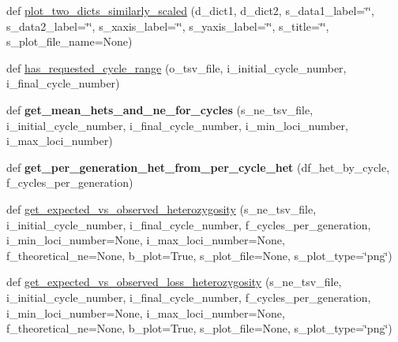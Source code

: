 \begin{DoxyCompactItemize}
\item 
def \hyperlink{namespacenegui_1_1pgvalidationtests_afbd41ca3bce1a778d97bd11efe270119}{plot\+\_\+two\+\_\+dicts\+\_\+similarly\+\_\+scaled} (d\+\_\+dict1, d\+\_\+dict2, s\+\_\+data1\+\_\+label=\char`\"{}\char`\"{}, s\+\_\+data2\+\_\+label=\char`\"{}\char`\"{}, s\+\_\+xaxis\+\_\+label=\char`\"{}\char`\"{}, s\+\_\+yaxis\+\_\+label=\char`\"{}\char`\"{}, s\+\_\+title=\char`\"{}\char`\"{}, s\+\_\+plot\+\_\+file\+\_\+name=None)
\item 
def \hyperlink{namespacenegui_1_1pgvalidationtests_acebbfd32727989f141b02f26e736b41c}{has\+\_\+requested\+\_\+cycle\+\_\+range} (o\+\_\+tsv\+\_\+file, i\+\_\+initial\+\_\+cycle\+\_\+number, i\+\_\+final\+\_\+cycle\+\_\+number)
\item 
def {\bfseries get\+\_\+mean\+\_\+hets\+\_\+and\+\_\+ne\+\_\+for\+\_\+cycles} (s\+\_\+ne\+\_\+tsv\+\_\+file, i\+\_\+initial\+\_\+cycle\+\_\+number, i\+\_\+final\+\_\+cycle\+\_\+number, i\+\_\+min\+\_\+loci\+\_\+number, i\+\_\+max\+\_\+loci\+\_\+number)\hypertarget{namespacenegui_1_1pgvalidationtests_a9d13db8def69ba2b1deeab9fd32eddf6}{}\label{namespacenegui_1_1pgvalidationtests_a9d13db8def69ba2b1deeab9fd32eddf6}

\item 
def {\bfseries get\+\_\+per\+\_\+generation\+\_\+het\+\_\+from\+\_\+per\+\_\+cycle\+\_\+het} (df\+\_\+het\+\_\+by\+\_\+cycle, f\+\_\+cycles\+\_\+per\+\_\+generation)\hypertarget{namespacenegui_1_1pgvalidationtests_a476166538477fd8ec295be2c1abd96d7}{}\label{namespacenegui_1_1pgvalidationtests_a476166538477fd8ec295be2c1abd96d7}

\item 
def \hyperlink{namespacenegui_1_1pgvalidationtests_ad83e2cd3fe77a764bb938366618034f1}{get\+\_\+expected\+\_\+vs\+\_\+observed\+\_\+heterozygosity} (s\+\_\+ne\+\_\+tsv\+\_\+file, i\+\_\+initial\+\_\+cycle\+\_\+number, i\+\_\+final\+\_\+cycle\+\_\+number, f\+\_\+cycles\+\_\+per\+\_\+generation, i\+\_\+min\+\_\+loci\+\_\+number=None, i\+\_\+max\+\_\+loci\+\_\+number=None, f\+\_\+theoretical\+\_\+ne=None, b\+\_\+plot=True, s\+\_\+plot\+\_\+file=None, s\+\_\+plot\+\_\+type=\char`\"{}png\char`\"{})
\item 
def \hyperlink{namespacenegui_1_1pgvalidationtests_a0b82e2c871359b7ca528866f4dcd7ed5}{get\+\_\+expected\+\_\+vs\+\_\+observed\+\_\+loss\+\_\+heterozygosity} (s\+\_\+ne\+\_\+tsv\+\_\+file, i\+\_\+initial\+\_\+cycle\+\_\+number, i\+\_\+final\+\_\+cycle\+\_\+number, f\+\_\+cycles\+\_\+per\+\_\+generation, i\+\_\+min\+\_\+loci\+\_\+number=None, i\+\_\+max\+\_\+loci\+\_\+number=None, f\+\_\+theoretical\+\_\+ne=None, b\+\_\+plot=True, s\+\_\+plot\+\_\+file=None, s\+\_\+plot\+\_\+type=\char`\"{}png\char`\"{})
\end{DoxyCompactItemize}
